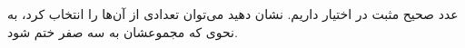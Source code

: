 عدد صحیح مثبت در اختیار داریم.
نشان دهید می‌توان تعدادی از آن‌ها را انتخاب کرد،
به نحوی که مجموعشان به سه صفر ختم شود.
